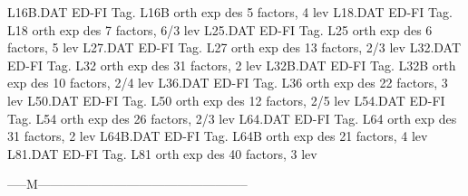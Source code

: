 L16B.DAT                    ED-FI Tag. L16B orth exp des  5 factors,   4 lev
L18.DAT                     ED-FI Tag. L18  orth exp des  7 factors, 6/3 lev
L25.DAT                     ED-FI Tag. L25  orth exp des  6 factors,   5 lev
L27.DAT                     ED-FI Tag. L27  orth exp des 13 factors, 2/3 lev
L32.DAT                     ED-FI Tag. L32  orth exp des 31 factors,   2 lev
L32B.DAT                    ED-FI Tag. L32B orth exp des 10 factors, 2/4 lev
L36.DAT                     ED-FI Tag. L36  orth exp des 22 factors,   3 lev
L50.DAT                     ED-FI Tag. L50  orth exp des 12 factors, 2/5 lev
L54.DAT                     ED-FI Tag. L54  orth exp des 26 factors, 2/3 lev
L64.DAT                     ED-FI Tag. L64  orth exp des 31 factors,   2 lev
L64B.DAT                    ED-FI Tag. L64B orth exp des 21 factors,   4 lev
L81.DAT                     ED-FI Tag. L81  orth exp des 40 factors,   3 lev

-----M--------------------------------------------------

